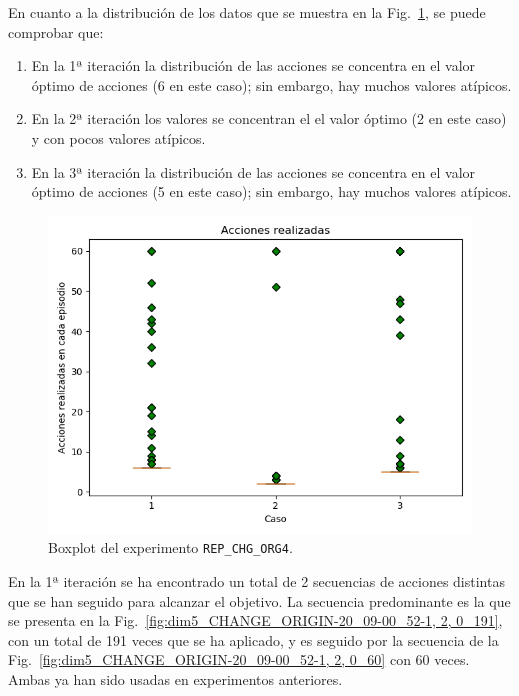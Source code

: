 En cuanto a la distribución de los datos que se muestra en la Fig.~\ref{fig:CHANGE_ORIGIN-20_09-00_57-2, 0, 1_boxplot}, se puede comprobar que:
\begin{enumerate}
    \item En la 1ª iteración la distribución de las acciones se concentra en el valor óptimo de acciones (6 en este caso); sin embargo, hay muchos valores atípicos.
    \item En la 2ª iteración los valores se concentran el el valor óptimo (2 en este caso) y con pocos valores atípicos.
    \item En la 3ª iteración la distribución de las acciones se concentra en el valor óptimo de acciones (5 en este caso); sin embargo, hay muchos valores atípicos.
\end{enumerate}
 
\begin{figure}
    \centering
    \includegraphics[scale=0.4]{cap5_experimentacion/images/CHANGE_ORIGIN-20_09-00_57-2, 0, 1_boxplot.png}
    \caption{Boxplot del experimento \texttt{REP\_CHG\_ORG4}.}
    \label{fig:CHANGE_ORIGIN-20_09-00_57-2, 0, 1_boxplot}
\end{figure}

En la 1ª iteración se ha encontrado un total de 2 secuencias de acciones distintas que se han seguido para alcanzar el objetivo. La secuencia predominante es la que se presenta en la Fig.~\ref{fig:dim5_CHANGE_ORIGIN-20_09-00_52-1, 2, 0_191}, con un total de 191 veces que se ha aplicado, y es seguido por la secuencia de la Fig.~\ref{fig:dim5_CHANGE_ORIGIN-20_09-00_52-1, 2, 0_60} con 60 veces. Ambas ya han sido usadas en experimentos anteriores. \\

